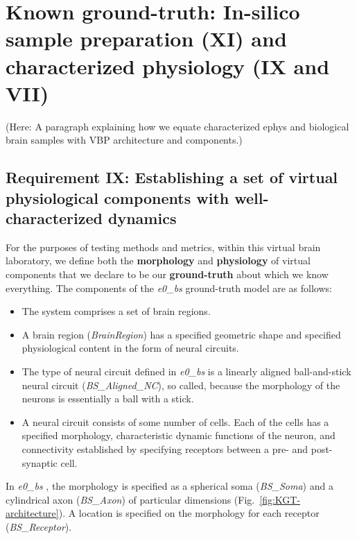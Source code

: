 \documentclass{ldr-article}
\def\firstexp{\textit{e0\_bs} }
\begin{document}
\section{Known ground-truth: In-silico sample preparation (XI) and characterized physiology (IX and VII)}

(Here: A paragraph explaining how we equate characterized ephys and biological brain samples with VBP architecture and components.)


\subsection{Requirement IX: Establishing a set of virtual physiological components with well-characterized dynamics}

For the purposes of testing methods and metrics, within this virtual brain laboratory, we define both the \textbf{morphology} and \textbf{physiology} of virtual components that we declare to be our \textbf{ground-truth} about which we know everything. The components of the \firstexp ground-truth model are as follows:

\begin{itemize}
	\item The system comprises a set of brain regions.
	\item A brain region (\textit{BrainRegion}) has a specified geometric shape and specified physiological content in the form of neural circuits.
	\item The type of neural circuit defined in \firstexp is a linearly aligned ball-and-stick neural circuit (\textit{BS\_Aligned\_NC}), so called, because the morphology of the neurons is essentially a ball with a stick.
	\item A neural circuit consists of some number of cells. Each of the cells has a specified morphology, characteristic dynamic functions of the neuron, and connectivity established by specifying receptors between a pre- and post-synaptic cell.
\end{itemize}

In \firstexp, the morphology is specified as a spherical soma (\textit{BS\_Soma}) and a cylindrical axon (\textit{BS\_Axon}) of particular dimensions (Fig.~\ref{fig:KGT-architecture}). A location is specified on the morphology for each receptor (\textit{BS\_Receptor}).
\end{document}
